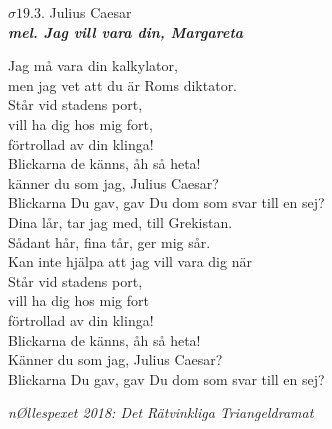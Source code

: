 \documentclass[a6paper,10pt]{article}
\newcommand{\mel}[1]{\small\textbf{\textit{mel. #1 \\}}}
\begin{document}
\setlength{\oddsidemargin}{-0.37in}
\vspace{35pt}

\begin{center}
\Large $\sigma19.3$. Julius Caesar \\ 
\mel{Jag vill vara din, Margareta}
\end{center}
\small Jag må vara din kalkylator, \\
men jag vet att du är Roms diktator. \\
Står vid stadens port, \\
vill ha dig hos mig fort, \\
förtrollad av din klinga!
\vspace{5pt} \\
Blickarna de känns, åh så heta! \\
känner du som jag, Julius Caesar? \\
Blickarna Du gav, gav Du dom som svar till en sej?
\vspace{5pt} \\
Dina lår, tar jag med, till Grekistan. \\
Sådant hår, fina tår, ger mig sår. \\
Kan inte hjälpa att jag vill vara dig när
\vspace{5pt} \\
Står vid stadens port, \\ 
vill ha dig hos mig fort\\
förtrollad av din klinga!  	
\vspace{5pt}\\
Blickarna de känns, åh så heta!\\
Känner du som jag, Julius Caesar?\\
Blickarna Du gav, gav Du dom som svar till en sej?

\begin{flushright}
\textit{nØllespexet 2018: Det Rätvinkliga Triangeldramat}
\end{flushright}

\setlength{\oddsidemargin}{-0.47in}
\end{document}
